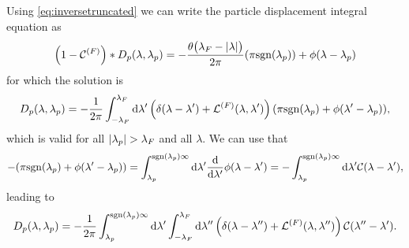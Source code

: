 \documentclass[11pt, a4paper]{report} %
\begin{document}
Using \cref{eq:inversetruncated} we can write the particle displacement integral equation as 
\begin{align}
  \label{eq:33}
  \qty(1 - \mathcal{C}^{(F)}) * D_p\qty(\lambda, \lambda_p) = -\frac{\theta\qty\big(\lambda_F-\abs{\lambda})}{2\pi} \qty(\pi\textrm{sgn}\qty(\lambda_p)) + \phi\qty(\lambda-\lambda_p)
\end{align}
for which the solution is 
\begin{align}
  \label{eq:34}
  D_p\qty(\lambda,\lambda_p) = -\frac{1}{2\pi} \int_{-\lambda_F}^{\lambda_F} \dd \lambda' \left(\delta\qty(\lambda-\lambda') + \mathcal{L}^{(F)}\qty(\lambda,\lambda') \right)\qty(\pi \mathrm{sgn}\qty(\lambda_p) + \phi\qty(\lambda'-\lambda_p)),
\end{align}
which is valid for all \(\abs{\lambda_p}>\lambda_F\) and all \(\lambda\).
We can use that
\begin{align}
  \label{eq:35}
  -\qty(\pi \mathrm{sgn}\qty(\lambda_p) + \phi\qty(\lambda'-\lambda_p)) = \int_{\lambda_p}^{\mathrm{sgn}\qty(\lambda_p)\infty} \dd \lambda' \frac{\dd}{\dd\lambda'} \phi\qty(\lambda-\lambda') 
                                                                          = - \int_{\lambda_p}^{\mathrm{sgn}\qty(\lambda_p)\infty}\dd \lambda' \mathcal{C}\qty(\lambda-\lambda'),
\end{align}
leading to~\cite{Caux2015}
\begin{align}
  \label{eq:particledisplacement}
  	D_p\qty(\lambda, \lambda_p) = -\frac{1}{2\pi}  \int_{\lambda_p}^{\textrm{sgn}\qty(\lambda_p)\infty} \dd \lambda' \int_{-\lambda_F}^{\lambda_F} \dd  \lambda'' \left(\delta\qty(\lambda-\lambda'') + \mathcal{L}^{(F)}\qty(\lambda,\lambda'') \right)\mathcal{C}\qty(\lambda''-\lambda').
\end{align}
\end{document}
